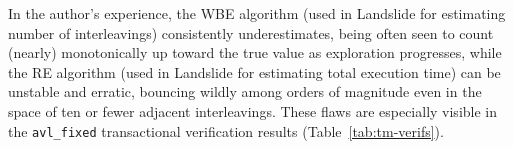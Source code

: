 In the author's experience,
the WBE algorithm (used in Landslide for estimating number of interleavings) consistently underestimates,
being often seen to count (nearly) monotonically up toward the true value as exploration progresses,
while the RE algorithm (used in Landslide for estimating total execution time) can be unstable and erratic,
bouncing wildly among orders of magnitude even in the space of ten or fewer adjacent interleavings.
These flaws are especially visible in the {\tt avl\_fixed} transactional verification results (Table~\ref{tab:tm-verifs}).





